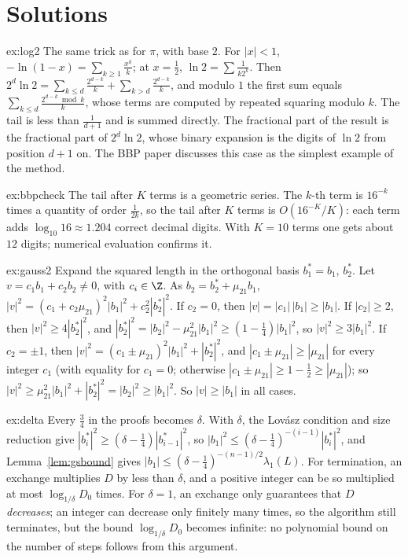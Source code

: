 \section{Solutions}

\begin{solution}{ex:log2}
\idea The same trick as for $\pi$, with base $2$.
\writeup For $|x|<1$, $-\ln(1-x)=\sum_{k\ge1}\frac{x^k}k$; at $x=\frac12$, $\ln2=\sum\frac1{k2^k}$. Then $2^d\ln2=\sum_{k\le d}\frac{2^{d-k}}k+\sum_{k>d}\frac{2^{d-k}}k$, and modulo $1$ the first sum equals $\sum_{k\le d}\frac{2^{d-k}\bmod k}k$, whose terms
are computed by repeated squaring modulo $k$. The tail is less than $\frac1{d+1}$ and is summed directly. The fractional part of the result is the fractional part of $2^d\ln2$, whose binary expansion
is the digits of $\ln2$ from position $d+1$ on. The BBP paper discusses this case as the simplest example of the method.
\end{solution}

\begin{solution}{ex:bbpcheck}
\idea The tail after $K$ terms is a geometric series.
\writeup The $k$-th term is $16^{-k}$ times a quantity of order $\frac1{2k}$, so the tail after $K$ terms is $O(16^{-K}/K)$: each term adds $\log_{10}16\approx1.204$ correct decimal digits. With $K=10$ terms one gets
about $12$ digits; numerical evaluation confirms it.
\end{solution}

\begin{solution}{ex:gauss2}
\idea Expand the squared length in the orthogonal basis $b_1^*=b_1$, $b_2^*$.
\writeup Let $v=c_1b_1+c_2b_2\ne0$, with $c_i\in\Z$. As $b_2=b_2^*+\mu_{21}b_1$, $|v|^2=(c_1+c_2\mu_{21})^2|b_1|^2+c_2^2|b_2^*|^2$. If $c_2=0$, then $|v|=|c_1|\,|b_1|\ge|b_1|$. If $|c_2|\ge2$, then $|v|^2\ge4|b_2^*|^2$, and
$|b_2^*|^2=|b_2|^2-\mu_{21}^2|b_1|^2\ge(1-\frac14)|b_1|^2$, so $|v|^2\ge3|b_1|^2$. If $c_2=\pm1$, then $|v|^2=(c_1\pm\mu_{21})^2|b_1|^2+|b_2^*|^2$, and $|c_1\pm\mu_{21}|\ge|\mu_{21}|$ for every integer $c_1$ (with equality for $c_1=0$; otherwise $|c_1\pm\mu_{21}|\ge1-\frac12\ge|\mu_{21}|$); so
$|v|^2\ge\mu_{21}^2|b_1|^2+|b_2^*|^2=|b_2|^2\ge|b_1|^2$. So $|v|\ge|b_1|$ in all cases.
\end{solution}

\begin{solution}{ex:delta}
\idea Every $\frac34$ in the proofs becomes $\delta$.
\writeup With $\delta$, the Lov\'asz condition and size reduction give $|b_i^*|^2\ge(\delta-\frac14)|b_{i-1}^*|^2$, so $|b_1|^2\le(\delta-\frac14)^{-(i-1)}|b_i^*|^2$, and Lemma~\ref{lem:gsbound} gives $|b_1|\le(\delta-\frac14)^{-(n-1)/2}\lambda_1(L)$. For termination, an exchange
multiplies $D$ by less than $\delta$, and a positive integer can be so multiplied at most $\log_{1/\delta}D_0$ times. For $\delta=1$, an exchange only guarantees that $D$ \emph{decreases}; an integer
can decrease only finitely many times, so the algorithm still terminates, but the bound $\log_{1/\delta}D_0$ becomes infinite: no polynomial bound on the number of steps follows from this argument.
\end{solution}

